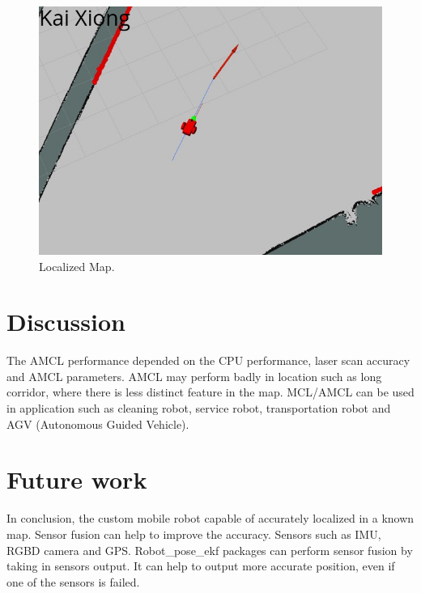 \documentclass[10pt,journal,compsoc]{IEEEtran}
\begin{document}
\begin{figure}[thpb]
      \centering
      \includegraphics[width=\linewidth]{move_base.jpg}
      \caption{Localized Map.}
      \label{fig:robot4}
\end{figure}

\section{Discussion}
The AMCL performance depended on the CPU performance, laser scan accuracy and AMCL parameters. AMCL may perform badly in location such as long corridor, where there is less distinct feature in the map. MCL/AMCL can be used in application such as cleaning robot, service robot, transportation robot and AGV (Autonomous Guided Vehicle).

\section{Future work}
In conclusion, the custom mobile robot capable of accurately localized in a known map. Sensor fusion can help to improve the accuracy. Sensors such as IMU, RGBD camera and GPS. Robot\_pose\_ekf packages can perform sensor fusion by taking in sensors output. It can help to output more accurate position, even if one of the sensors is failed.
\end{document}
